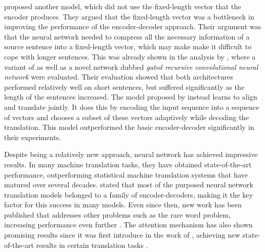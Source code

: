 \citep{bahdanau2014neural} proposed another model, which did not use the fixed-length vector that the encoder produces. They argued that the fixed-length vector was a bottleneck in improving the performance of the encoder-decoder approach. Their argument was that the neural network needed to compress all the necessary information of a source sentence into a fixed-length vector, which may make make it difficult to cope with longer sentences. This was already shown in the analysis by \citep{cho2014properties}, where a variant of \citep{cho2014learning} as well as a novel network dubbed \textit{gated recursive convolutional neural network} were evaluated. Their evaluation showed that both architectures performed relatively well on short sentences, but suffered significantly as the length of the sentences increased. The model proposed by \citep{bahdanau2014neural} instead learns to align and translate jointly. It does this by encoding the input sequence into a sequence of vectors and chooses a subset of these vectors adaptively while decoding the translation. This model outperformed the basic encoder-decoder significantly in their experiments.

Despite being a relatively new approach, neural network has achieved impressive results. In many machine translation tasks, they have obtained state-of-the-art performance, outperforming statistical machine translation systems that have matured over several decades. \citep{bahdanau2014neural} stated that most of the purposed neural network translation models belonged to a family of encoder-decoders, making it the key factor for this success in many models. Even since then, new work has been published that addresses other problems such as the rare word problem, increasing performance even further \citep{sennrich2015neural}. The attention mechanism has also shown promising results since it was first introduce in the work of \citep{bahdanau2014neural}, achieving new state-of-the-art results in certain translation tasks \citep{luong2015effective}. 